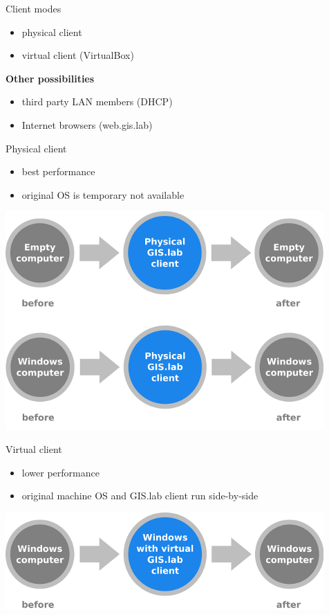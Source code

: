 \documentclass[12pt]{beamer}
\begin{document}
\begin{frame}{Client modes}
	\begin{itemize}
		\item physical client
		\item virtual client (VirtualBox)
	\end{itemize}

	\bigskip
	\textbf{Other possibilities}
	\begin{itemize}
		\item third party LAN members (DHCP)
		\item Internet browsers (web.gis.lab)
	\end{itemize}
\end{frame}


\begin{frame}{Physical client}
	\begin{itemize}
		\item best performance
		\item original OS is temporary not available 
	\end{itemize}
	\begin{center}
		\includegraphics[keepaspectratio=true,height=0.6\textheight]{images/schema-physical-client.png}
	\end{center}
\end{frame}


\begin{frame}{Virtual client}
	\begin{itemize}
		\item lower performance
		\item original machine OS and GIS.lab client run side-by-side
	\end{itemize}
	\begin{center}
		\includegraphics[keepaspectratio=true,height=0.4\textheight]{images/schema-virtual-client.png}
	\end{center}
\end{frame}
\end{document}
